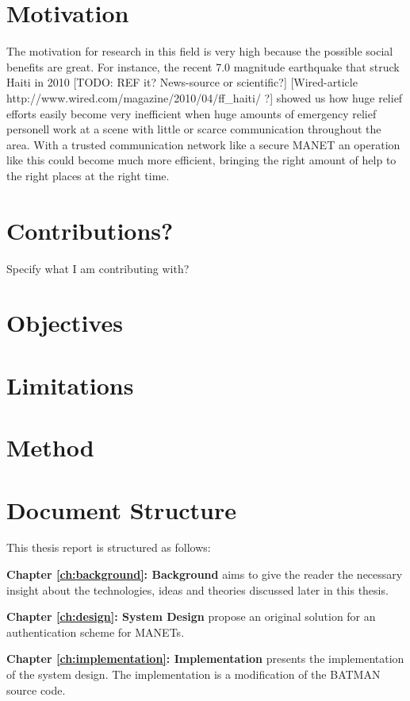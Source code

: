 \section{Motivation}
The motivation for research in this field is very high because the possible
social benefits are great. For instance, the recent 7.0 magnitude earthquake
that struck Haiti in 2010 [TODO: REF it? News-source or scientific?]
[Wired-article http://www.wired.com/magazine/2010/04/ff_haiti/ ?] showed us how
huge relief efforts easily become very inefficient when huge amounts of
emergency relief personell work at a scene with little or scarce communication
throughout the area. With a trusted communication network like a secure
\ac{MANET} an operation like this could become much more efficient, bringing the
right amount of help to the right places at the right time.

\section{Contributions?}
Specify what I am contributing with?

\section{Objectives}

\section{Limitations}

\section{Method}

\section{Document Structure}
This thesis report is structured as follows:

\textbf{Chapter \ref{ch:background}: Background} aims to give the reader the
necessary insight about the technologies, ideas and theories discussed later in
this thesis.

\textbf{Chapter \ref{ch:design}: System Design} propose an original solution
for an authentication scheme for \acp{MANET}.

\textbf{Chapter \ref{ch:implementation}: Implementation} presents the
implementation of the system design. The implementation is a modification of the
\ac{BATMAN} source code.

